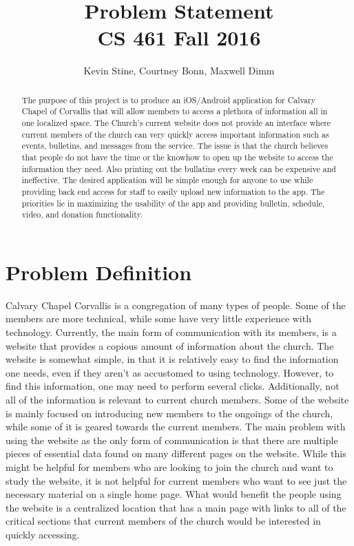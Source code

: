 \documentclass[letterpaper,10pt,draftclsnofoot,onecolumn,titlepage]{IEEEtran}
\def\name{Kevin Stine, Courtney Bonn, Maxwell Dimm}
\begin{document}
	\title{\huge Problem Statement \\ CS 461 Fall 2016}
	\author{\large \name}
	
	\maketitle
		\begin{abstract}The purpose of this project is to produce an iOS/Android application for Calvary Chapel of Corvallis that will allow members to access a plethora of information all in one localized space. 
		The Church's current website does not provide an interface where current members of the church can very quickly access important information such as events, bulletins, and messages from the service. 
		The issue is that the church believes that people do not have the time or the knowhow to open up the website to access the information they need. 
		Also printing out the bullatins every week can be expensive and ineffective.
		The desired application will be simple enough for anyone to use while providing back end access for staff to easily upload new information to the app. 
		The priorities lie in maximizing the usability of the app and providing bulletin, schedule, video, and donation functionality.  
		\end{abstract}
	
	\clearpage	
		
	\section*{Problem Definition}
	Calvary Chapel Corvallis is a congregation of many types of people.
	Some of the members are more technical, while some have very little experience with technology. 
	Currently, the main form of communication with its members, is a website that provides a copious amount of information about the church. 
	The website is somewhat simple, in that it is relatively easy to find the information one needs, even if they aren't as accustomed to using technology. 
	However, to find this information, one may need to perform several clicks. 
	Additionally, not all of the information is relevant to current church members. 
	Some of the website is mainly focused on introducing new members to the ongoings of the church, while some of it is geared towards the current members.
	The main problem with using the website as the only form of communication is that there are multiple pieces of essential data found on many different pages on the website.
	While this might be helpful for members who are looking to join the church and want to study the website, it is not helpful for current members who want to see just the necessary material on a single home page. 
	What would benefit the people using the website is a centralized location that has a main page with links to all of the critical sections that current members of the church would be interested in quickly accessing.
	
\end{document}
